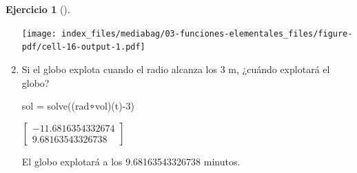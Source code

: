 \documentclass[
  a4paper,
]{scrreport}
\newenvironment{Shaded}{\begin{snugshade}}{\end{snugshade}}
\newcommand{\FloatTok}[1]{\textcolor[rgb]{0.68,0.00,0.00}{#1}}
\newcommand{\FunctionTok}[1]{\textcolor[rgb]{0.28,0.35,0.67}{#1}}
\newcommand{\NormalTok}[1]{\textcolor[rgb]{0.00,0.23,0.31}{#1}}
\newcommand{\OperatorTok}[1]{\textcolor[rgb]{0.37,0.37,0.37}{#1}}
\theoremstyle{definition}
\newtheorem{exercise}{Ejercicio}[chapter]
\theoremstyle{remark}
\begin{document}
\begin{exercise}[]
\begin{enumerate}
\begin{tcolorbox}
  \texttt{[image: index\_files/mediabag/03-funciones-elementales\_files/figure-pdf/cell-16-output-1.pdf]}

  \end{tcolorbox}
\item
  Si el globo explota cuando el radio alcanza los 3 m, ¿cuándo explotará
  el globo?

  \begin{tcolorbox}[enhanced jigsaw, bottomtitle=1mm, rightrule=.15mm, left=2mm, colback=white, title=\textcolor{quarto-callout-tip-color}{\faLightbulb}\hspace{0.5em}{Solución}, bottomrule=.15mm, colframe=quarto-callout-tip-color-frame, toprule=.15mm, leftrule=.75mm, opacityback=0, coltitle=black, breakable, colbacktitle=quarto-callout-tip-color!10!white, arc=.35mm, toptitle=1mm, titlerule=0mm, opacitybacktitle=0.6]

\begin{Shaded}
\begin{Highlighting}[]
\NormalTok{sol }\OperatorTok{=} \FunctionTok{solve}\NormalTok{((rad}\OperatorTok{∘}\NormalTok{vol)(t)}\OperatorTok{{-}}\FloatTok{3}\NormalTok{)}
\end{Highlighting}
\end{Shaded}

  $\left[\begin{smallmatrix}-11.6816354332674\\9.68163543326738\end{smallmatrix}\right]$

  El globo explotará a los 9.68163543326738 minutos.

  \end{tcolorbox}
\end{enumerate}

\end{exercise}
\end{document}
